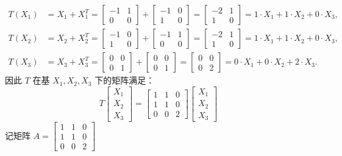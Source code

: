 \documentclass{article}
\begin{document}
\[
\begin{aligned}
T(X_1) &= X_1 + X_1^T = \begin{bmatrix} -1 & 1 \\ 0 & 0 \end{bmatrix} + \begin{bmatrix} -1 & 0 \\ 1 & 0 \end{bmatrix} = \begin{bmatrix} -2 & 1 \\ 1 & 0 \end{bmatrix}
= 1\cdot X_1 + 1\cdot X_2 + 0\cdot X_3, \\[4pt]
T(X_2) &= X_2 + X_2^T = \begin{bmatrix} -1 & 0 \\ 1 & 0 \end{bmatrix} + \begin{bmatrix} -1 & 1 \\ 0 & 0 \end{bmatrix} = \begin{bmatrix} -2 & 1 \\ 1 & 0 \end{bmatrix}
= 1\cdot X_1 + 1\cdot X_2 + 0\cdot X_3, \\[4pt]
T(X_3) &= X_3 + X_3^T = \begin{bmatrix} 0 & 0 \\ 0 & 1 \end{bmatrix} + \begin{bmatrix} 0 & 0 \\ 0 & 1 \end{bmatrix} = \begin{bmatrix} 0 & 0 \\ 0 & 2 \end{bmatrix}
= 0\cdot X_1 + 0\cdot X_2 + 2\cdot X_3.
\end{aligned}
\]
因此 $T$ 在基 $X_1,X_2,X_3$ 下的矩阵满足：
\[
T\begin{bmatrix} X_1 \\ X_2 \\ X_3 \end{bmatrix}
= \begin{bmatrix} 1 & 1 & 0 \\ 1 & 1 & 0 \\ 0 & 0 & 2 \end{bmatrix}
\begin{bmatrix} X_1 \\ X_2 \\ X_3 \end{bmatrix}
\]
记矩阵 $A = \begin{bmatrix} 1 & 1 & 0 \\ 1 & 1 & 0 \\ 0 & 0 & 2 \end{bmatrix}$
\end{document}

